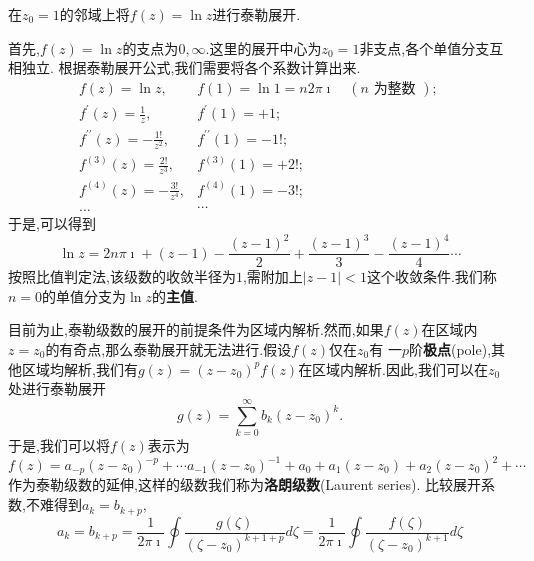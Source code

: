 \begin{example}
在$z_0=1$的邻域上将$f(z) = \ln{z}$进行泰勒展开.
\end{example}
\begin{solution}
    首先,$f(z) = \ln z $的支点为$0,\infty$.这里的展开中心为$z_0=1$非支点,各个单值分支互相独立.
    根据泰勒展开公式,我们需要将各个系数计算出来.
    \[
        \begin{array}{ll}
            f(z)=\ln z, & f(1)=\ln 1=n 2 \pi \imath \quad(n \text { 为整数 }) \text {; } \\
            f^{\prime}(z)=\frac{1}{z}, & f^{\prime}(1)=+1 ; \\
            f^{\prime \prime}(z)=-\frac{1 !}{z^2}, & f^{\prime \prime}(1)=-1 ! ; \\
            f^{(3)}(z)=\frac{2 !}{z^3}, & f^{(3)}(1)=+2 ! ; \\
            f^{(4)}(z)=-\frac{3 !}{z^4}, & f^{(4)}(1)=-3 ! ; \\
            \ldots & \cdots
            \end{array}
    \]
    于是,可以得到
    \[
    \ln z = 2 n \pi \imath + (z-1) - \frac{(z-1)^2}{2} +  \frac{(z-1)^3}{3} -  \frac{(z-1)^4}{4} \cdots
    \]
    按照比值判定法,该级数的收敛半径为$1$,需附加上$|z-1|< 1$这个收敛条件.我们称$n=0$的单值分支为$\ln z $的\textbf{主值}.
\end{solution}

目前为止,泰勒级数的展开的前提条件为区域内解析.然而,如果$f(z)$在区域内$z=z_0$的有奇点,那么泰勒展开就无法进行.假设$f(z)$仅在$z_0$有
一$p$阶\textbf{极点}(pole),其他区域均解析,我们有$g(z) = (z-z_0)^p f(z)$在区域内解析.因此,我们可以在$z_0$处进行泰勒展开
\begin{equation}
    g(z) = \sum_{k=0}^{\infty} b_k (z-z_0)^{k} .
\end{equation}
于是,我们可以将$f(z)$表示为
\begin{equation}
    f(z) = a_{-p} (z-z_0)^{-p} + \cdots a_{-1}(z-z_0)^{-1} + a_0 + a_{1} (z-z_0) + a_{2} (z-z_0)^2 + \cdots 
\end{equation}
作为泰勒级数的延伸,这样的级数我们称为\textbf{洛朗级数}(Laurent series).
比较展开系数,不难得到$a_k = b_{k+p}$,
\begin{equation}
    a_k = b_{k+p} = \frac{1}{2\pi \imath} \oint \frac{g(\zeta)}{(\zeta - z_0)^{k+1+p}} d\zeta 
    = \frac{1}{2\pi \imath} \oint \frac{f(\zeta)}{(\zeta - z_0)^{k+1}} d\zeta
\end{equation}

